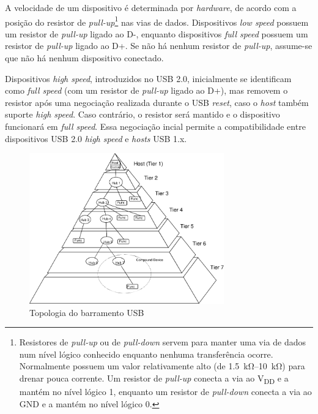 \documentclass[brazil,pagestart=firstchapter]{abnt}
\newcommand*{\VDD}{V\textsubscript{DD}\xspace}
\newcommand*{\GND}{GND\xspace}
\begin{document}
A velocidade de um dispositivo é determinada por \textit{hardware}, de
acordo com a posição do resistor de \textit{pull-up}\footnote{
	Resistores de \textit{pull-up} ou de \textit{pull-down} servem para
	manter uma via de dados num nível lógico conhecido enquanto nenhuma
	transferência ocorre.  Normalmente possuem um valor relativamente alto
	(de \SIrange{1.5}{10}{\kilo\ohm}) para drenar pouca corrente. Um
	resistor de \textit{pull-up} conecta a via ao \VDD e a mantém no nível
	lógico 1, enquanto um resistor de \textit{pull-down} conecta a via ao
	\GND e a mantém no nível lógico 0.}
nas vias de dados. Dispositivos
\textit{low speed} possuem um resistor de \textit{pull-up} ligado ao D-,
enquanto dispositivos \textit{full speed} possuem  um resistor de
\textit{pull-up} ligado ao D+. Se não há nenhum resistor de
\textit{pull-up}, assume-se que não há nenhum dispositivo conectado.
\cite[p.~141]{usb20} \cite[cap.~2]{usbinanutshell}

Dispositivos \textit{high speed}, introduzidos no \ac{USB} 2.0, inicialmente
se identificam como \textit{full speed} (com um resistor de \textit{pull-up}
ligado ao D+), mas removem o resistor após uma negociação realizada durante
o USB \textit{reset}, caso o \textit{host} também suporte \textit{high
speed}. Caso contrário, o resistor será mantido e o dispositivo funcionará
em \textit{full speed}. Essa negociação incial permite a compatibilidade
entre dispositivos USB 2.0 \textit{high speed} e \textit{hosts} USB 1.x.
\cite[p.~142]{usb20} \cite[cap.~2]{usbinanutshell}

\begin{figure}[h]
\centering
\includegraphics[width=0.75\textwidth]{img/usb_bus_topology.pdf}
\caption{Topologia do barramento USB}
\label{fig:usb_topology}
\end{figure}
\end{document}
